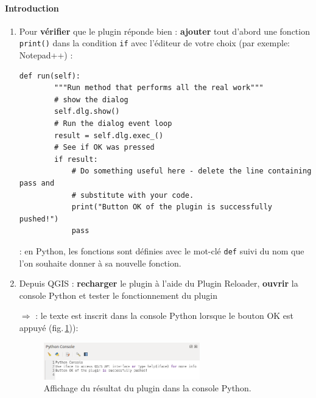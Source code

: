 \documentclass[11pt]{article}
\begin{document}
\paragraph*{Introduction}

\begin{enumerate}\itemsep0.4em
\item Pour \textbf{vérifier} que le plugin réponde bien : \textbf{ajouter} tout d'abord une fonction \og{}\texttt{print()}\fg{} dans la condition \og \texttt{if} \fg{} avec l'éditeur de votre choix (par exemple: Notepad++) :

\vspace*{-2em}
\begin{center}
\begin{minipage}[t]{0.98\textwidth}
\begin{verbatim}
def run(self):
        """Run method that performs all the real work"""
        # show the dialog
        self.dlg.show()
        # Run the dialog event loop
        result = self.dlg.exec_()
        # See if OK was pressed
        if result:
            # Do something useful here - delete the line containing pass and
            # substitute with your code.
            print("Button OK of the plugin is successfully pushed!")
            pass
\end{verbatim}
\end{minipage}
\end{center}
\vspace*{0.4em}

\underline{}: en Python, les fonctions sont définies avec le mot-clé \og \texttt{def} \fg{} suivi du nom que l'on souhaite donner à sa nouvelle fonction.

\vspace*{0.4em}
\item Depuis QGIS : \textbf{recharger} le plugin à l'aide du \og{}Plugin Reloader\fg{}, \textbf{ouvrir} la console Python et tester le fonctionnement du plugin





\newpage{}
$\Rightarrow$ \underline{}: le texte est inscrit dans la console Python lorsque le bouton \og OK \fg{} est appuyé (fig.\,\ref{resplug})):


\begin{figure}[H]
    \centering
    \includegraphics[width=0.64\textwidth]{plugin_first_result.png}
    \vspace*{-0.8em}
    \caption[Affichage du résultat du plugin dans la console Python.]{Affichage du résultat du plugin dans la console Python.}
    \label{resplug}
\end{figure}



\end{enumerate}
\end{document}
